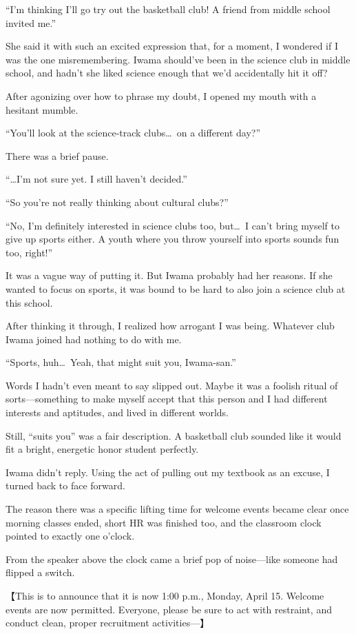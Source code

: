 \documentclass[
    a4paper,
    12pt,
    twoside,
    openany,
    UTF8,
    fontset=windows
]{ctexbook}
\begin{document}
``I'm thinking I'll go try out the basketball club! A friend from middle school invited me.''

She said it with such an excited expression that, for a moment, I wondered if I was the one misremembering. Iwama should've been in the science club in middle school, and hadn't she liked science enough that we'd accidentally hit it off?

After agonizing over how to phrase my doubt, I opened my mouth with a hesitant mumble.

``You'll look at the science-track clubs\dots\ on a different day?''

There was a brief pause.

``\dots I'm not sure yet. I still haven't decided.''

``So you're not really thinking about cultural clubs?''

``No, I'm definitely interested in science clubs too, but\dots\ I can't bring myself to give up sports either. A youth where you throw yourself into sports sounds fun too, right!''

It was a vague way of putting it. But Iwama probably had her reasons. If she wanted to focus on sports, it was bound to be hard to also join a science club at this school.

After thinking it through, I realized how arrogant I was being. Whatever club Iwama joined had nothing to do with me.

``Sports, huh\dots\ Yeah, that might suit you, Iwama-san.''

Words I hadn't even meant to say slipped out. Maybe it was a foolish ritual of sorts---something to make myself accept that this person and I had different interests and aptitudes, and lived in different worlds.

Still, ``suits you'' was a fair description. A basketball club sounded like it would fit a bright, energetic honor student perfectly.

Iwama didn't reply. Using the act of pulling out my textbook as an excuse, I turned back to face forward.

The reason there was a specific lifting time for welcome events became clear once morning classes ended, short HR was finished too, and the classroom clock pointed to exactly one o'clock.

From the speaker above the clock came a brief pop of noise---like someone had flipped a switch.

【This is to announce that it is now 1:00 p.m., Monday, April 15. Welcome events are now permitted. Everyone, please be sure to act with restraint, and conduct clean, proper recruitment activities---】
\end{document}
